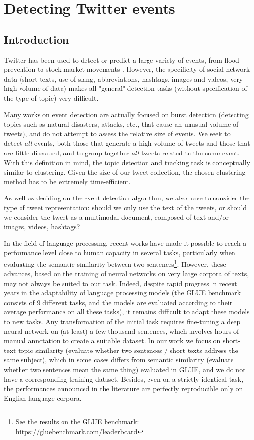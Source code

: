 
\chapter{Detecting Twitter events}
\label{Chap: Decting Twitter events}

\section{Introduction}
Twitter has been used to detect or predict a large variety of events,
from flood prevention \citep{de2017towards} to stock market movements
\citep{pagolu2016sentiment}. However, the specificity of social network data (short texts, use of
slang, abbreviations, hashtags, images and videos, very
high volume of data) makes all "general" detection tasks
(without specification
of the type of topic)
very difficult.

Many works on event detection are actually
focused on burst detection (detecting topics such as
natural disasters, attacks, etc., that cause an unusual
volume of tweets), and do not attempt to assess the
relative size of events. We seek to detect \textit{all} events, both
those that generate a high volume of tweets and those that
are little discussed, and to group together \textit{all} tweets
related to the same event. With this definition in mind, the
topic detection and tracking task is conceptually similar to 
clustering. Given the size of our tweet collection, 
the chosen clustering method has to be extremely time-efficient.

As well as deciding on the event detection algorithm, 
we also have to consider the type of tweet representation: 
should we only use the text of the tweets, or should we consider 
the tweet as a multimodal document, composed of text and/or images, videos, hashtags?

In the field of language processing, recent works
have made it possible to reach a performance level close to human capacity
in several tasks, 
particularly when evaluating the semantic similarity 
between two sentences\footnote{See the results on the GLUE benchmark: \url{https://gluebenchmark.com/leaderboard}}. However, these advances, 
based on the training of neural networks on very large corpora of texts,
may not always be suited to our task. Indeed, despite rapid progress 
in recent years in the adaptability of
language processing models (the GLUE benchmark \cite{wang2018glue} consists of
9 different tasks, and the models are evaluated according to their average performance on
all these tasks), it remains difficult to adapt these models to new tasks. 
Any transformation of the initial task requires fine-tuning a deep neural network 
on (at least) a few thousand sentences, which
involves hours of manual annotation to create a suitable dataset. 
In our work we focus on short-text topic similarity (evaluate whether two sentences / short texts
address the same subject), which in some cases differs from semantic similarity
(evaluate whether two sentences mean the same thing) evaluated in GLUE, and we do not 
have a corresponding training dataset. Besides, even on a strictly identical
task, the performances announced in the literature are perfectly reproducible 
only on English language corpora. 

